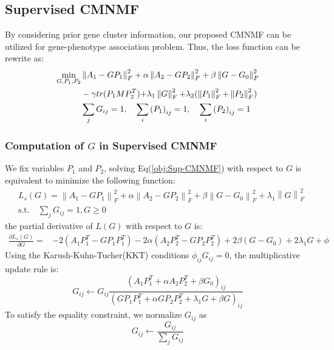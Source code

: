 \documentclass{bmcart}
\begin{document}
\subsection*{\textbf{Supervised CMNMF}}
By considering prior gene cluster information, our proposed CMNMF can be utilized for gene-phenotype association problem. Thus, the loss function can be rewrite as:
\begin{equation}\label{obj:Sup-CMNMF}
\begin{split}
\mathop {\min }\limits_{G,{P_1},{P_2}}
&\left\| {{A_1} - G{P_1}} \right\|_F^2 + \alpha \left\| {{A_2} - G{P_2}} \right\|_F^2 +\beta\left\| {G - {G_0}}\right\|_F^2\\
&- \gamma tr({P_1}MP_2^T){\rm{ + }}{\lambda _1}\left\| G \right\|_F^2{\rm{ + }}{\lambda _2}(\left\| {{P_1}} \right\|_F^2{\rm{ + }}\left\| {{P_2}} \right\|_F^2)\\
&\sum_jG_{ij}=1,\quad \sum_i{(P_1)}_{ij}=1,\quad \sum_i{(P_2)}_{ij}=1
\end{split}
\end{equation}

\subsubsection*{\textbf{Computation of $G$ in Supervised CMNMF}}
We fix variables $P_1$ and $P_2$, solving Eq(\ref{obj:Sup-CMNMF}) with respect to $G$ is equivalent to minimize the following function:
\begin{equation}\label{obj:sup_G}\nonumber
\begin{split}
&L_{s}(G)=\left\| {{A_1} - GP_1} \right\|_F^2 + \alpha \left\| {{A_2} - G{P_2}} \right\|_F^2
     +\beta\left\| {G - {G_0}}\right\|_F^2+{\lambda _1}\left\| G \right\|_F^2\\
     &\mathrm{s.t. }\quad \sum_jG_{ij}=1,G\ge 0
\end{split}
\end{equation}
the partial derivative of $L(G)$ with respect to $G$ is:
\begin{equation}\label{equ:G_gradient}\nonumber
\begin{split}
\frac{\partial{L_s(G)}}{\partial{G}}=
&-2(A_1{P_1^T} - G{P_1}{P_1^T})-2\alpha(A_2{P_2^T} - G{P_2}{P_2^T})+2\beta(G-G_0)+2\lambda_1G+\phi
\end{split}
\end{equation}
Using the Karush-Kuhn-Tucher(KKT) conditions $\phi_{ij}G_{ij}=0$, the multiplicative update rule is:
\begin{equation}\label{equ:updating_G}\nonumber
G_{ij}\leftarrow G_{ij}
\frac{(A_1P_1^T+\alpha A_2P_2^T+\beta G_0)_{ij}}
{(GP_1P_1^T+\alpha GP_2P_2^T+\lambda_1G+\beta G)_{ij}}
\end{equation}
To satisfy the equality constraint, we normalize $G_{ij}$ as
\begin{equation}\label{equ:updating_G}\nonumber
G_{ij}\leftarrow \frac{G_{ij}}{\sum_{j}G_{ij}}
\end{equation}
\end{document}
